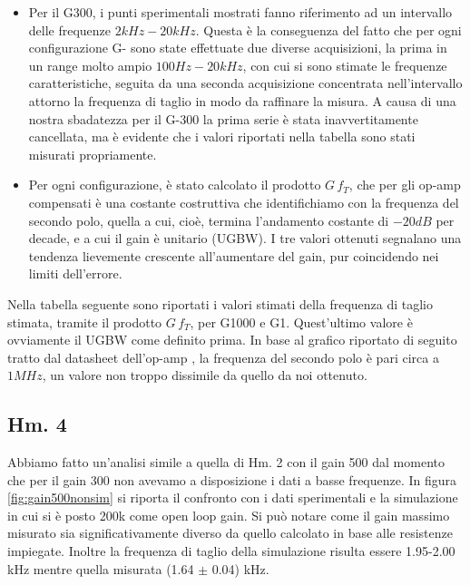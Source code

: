 \documentclass[journal, a4paper]{IEEEtran}
\begin{document}
\begin{itemize}
\item Per il G300, i punti sperimentali mostrati fanno riferimento ad un intervallo delle frequenze $2 \si{kHz} - 20 \si{kHz}$. Questa è la conseguenza del fatto che per ogni configurazione G- sono state effettuate due diverse acquisizioni, la prima in un range molto ampio $100 \si{Hz} - 20 \si{kHz}$, con cui si sono stimate le frequenze caratteristiche, seguita da una seconda acquisizione concentrata nell'intervallo attorno la frequenza di taglio in modo da raffinare la misura. A causa di una nostra sbadatezza per il G-300 la prima serie è stata inavvertitamente cancellata, ma è evidente che i valori riportati nella tabella sono stati misurati propriamente.\\

\item Per ogni configurazione, è stato calcolato il prodotto $ G \, f_T$, che per gli op-amp compensati è una costante costruttiva che identifichiamo con la frequenza del secondo polo, quella a cui, cioè, termina l'andamento costante di $-20 \si{dB} $ per decade, e a cui il gain è unitario (\textsc{UGBW}). I tre valori ottenuti segnalano una tendenza lievemente crescente all'aumentare del gain, pur coincidendo nei limiti dell'errore.
\end{itemize}

Nella tabella seguente sono riportati i valori stimati della frequenza di taglio stimata, tramite il prodotto  $ G \, f_T$, per G1000 e G1. Quest'ultimo valore è ovviamente il \textsc{UGBW} come definito prima. In base al grafico riportato di seguito tratto dal datasheet dell'op-amp %
, la frequenza del secondo polo è pari circa a $1 \si{MHz}$, un valore non troppo dissimile da quello da noi ottenuto.

\subsection{Hm. 4}

Abbiamo fatto un'analisi simile a quella di Hm. 2 con il gain 500 dal momento che per il gain 300 non avevamo a disposizione i dati a basse frequenze. In figura \ref{fig:gain500nonsim} si riporta il confronto con i dati sperimentali e la simulazione in cui si è posto 200k come open loop gain. Si può notare come il gain massimo misurato sia significativamente diverso da quello calcolato in base alle resistenze impiegate. Inoltre la frequenza di taglio della simulazione risulta essere 1.95-2.00 kHz mentre quella misurata (1.64 $\pm$ 0.04) kHz.
\end{document}

